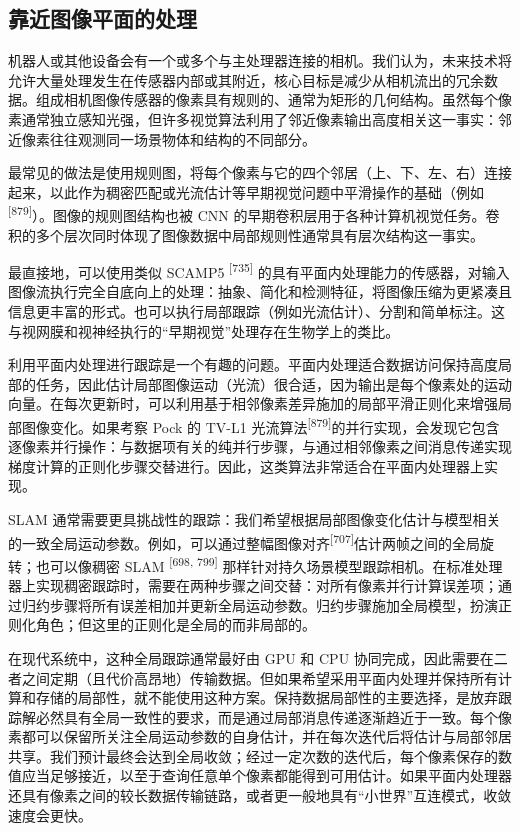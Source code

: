 \subsection{靠近图像平面的处理}

机器人或其他设备会有一个或多个与主处理器连接的相机。我们认为，未来技术将允许大量处理发生在传感器内部或其附近，核心目标是减少从相机流出的冗余数据。组成相机图像传感器的像素具有规则的、通常为矩形的几何结构。虽然每个像素通常独立感知光强，但许多视觉算法利用了邻近像素输出高度相关这一事实：邻近像素往往观测同一场景物体和结构的不同部分。

最常见的做法是使用规则图，将每个像素与它的四个邻居（上、下、左、右）连接起来，以此作为稠密匹配或光流估计等早期视觉问题中平滑操作的基础（例如\textsuperscript{[879]}）。图像的规则图结构也被 CNN 的早期卷积层用于各种计算机视觉任务。卷积的多个层次同时体现了图像数据中局部规则性通常具有层次结构这一事实。

最直接地，可以使用类似 SCAMP5 \textsuperscript{[735]} 的具有平面内处理能力的传感器，对输入图像流执行完全自底向上的处理：抽象、简化和检测特征，将图像压缩为更紧凑且信息更丰富的形式。也可以执行局部跟踪（例如光流估计）、分割和简单标注。这与视网膜和视神经执行的“早期视觉”处理存在生物学上的类比。

利用平面内处理进行跟踪是一个有趣的问题。平面内处理适合数据访问保持高度局部的任务，因此估计局部图像运动（光流）很合适，因为输出是每个像素处的运动向量。在每次更新时，可以利用基于相邻像素差异施加的局部平滑正则化来增强局部图像变化。如果考察 Pock 的 TV-L1 光流算法\textsuperscript{[879]}的并行实现，会发现它包含逐像素并行操作：与数据项有关的纯并行步骤，与通过相邻像素之间消息传递实现梯度计算的正则化步骤交替进行。因此，这类算法非常适合在平面内处理器上实现。

SLAM 通常需要更具挑战性的跟踪：我们希望根据局部图像变化估计与模型相关的一致全局运动参数。例如，可以通过整幅图像对齐\textsuperscript{[707]}估计两帧之间的全局旋转；也可以像稠密 SLAM \textsuperscript{[698, 799]} 那样针对持久场景模型跟踪相机。在标准处理器上实现稠密跟踪时，需要在两种步骤之间交替：对所有像素并行计算误差项；通过归约步骤将所有误差相加并更新全局运动参数。归约步骤施加全局模型，扮演正则化角色；但这里的正则化是全局的而非局部的。

在现代系统中，这种全局跟踪通常最好由 GPU 和 CPU 协同完成，因此需要在二者之间定期（且代价高昂地）传输数据。但如果希望采用平面内处理并保持所有计算和存储的局部性，就不能使用这种方案。保持数据局部性的主要选择，是放弃跟踪解必然具有全局一致性的要求，而是通过局部消息传递逐渐趋近于一致。每个像素都可以保留所关注全局运动参数的自身估计，并在每次迭代后将估计与局部邻居共享。我们预计最终会达到全局收敛；经过一定次数的迭代后，每个像素保存的数值应当足够接近，以至于查询任意单个像素都能得到可用估计。如果平面内处理器还具有像素之间的较长数据传输链路，或者更一般地具有“小世界”互连模式，收敛速度会更快。

